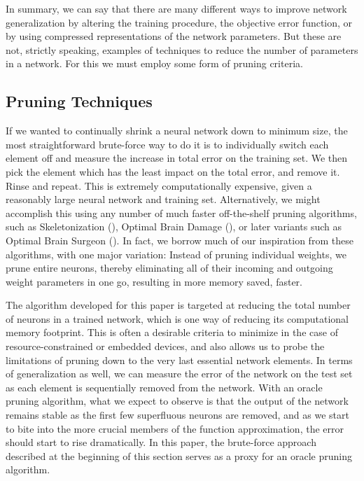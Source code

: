 In summary, we can say that there are many different ways to improve network generalization by altering the training procedure, the objective error function, or by using compressed representations of the network parameters. But these are not, strictly speaking, examples of techniques to reduce the number of parameters in a network. For this we must employ some form of pruning criteria. 

\subsection{Pruning Techniques}

If we wanted to continually shrink a neural network down to minimum size, the most straightforward brute-force way to do it is to individually switch each element off and measure the increase in total error on the training set. We then pick the element which has the least impact on the total error, and remove it. Rinse and repeat. This is extremely computationally expensive, given a reasonably large neural network and training set. Alternatively, we might accomplish this using any number of much faster off-the-shelf pruning algorithms, such as Skeletonization (\cite{mozer1989skeletonization}), Optimal Brain Damage (\cite{lecun1989optimal}), or later variants such as Optimal Brain Surgeon (\cite{hassibi1993second}). In fact, we borrow much of our inspiration from these algorithms, with one major variation: Instead of pruning individual weights, we prune entire neurons, thereby eliminating all of their incoming and outgoing weight parameters in one go, resulting in more memory saved, faster.

The algorithm developed for this paper is targeted at reducing the total number of neurons in a trained network, which is one way of reducing its computational memory footprint. This is often a desirable criteria to minimize in the case of resource-constrained or embedded devices, and also allows us to probe the limitations of pruning down to the very last essential network elements. In terms of generalization as well, we can measure the error of the network on the test set as each element is sequentially removed from the network. With an oracle pruning algorithm, what we expect to observe is that the output of the network remains stable as the first few superfluous neurons are removed, and as we start to bite into the more crucial members of the function approximation, the error should start to rise dramatically. In this paper, the brute-force approach described at the beginning of this section serves as a proxy for an oracle pruning algorithm. 

